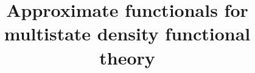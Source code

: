 \documentclass[journal=jacsat,manuscript=article]{achemso}
\author{}
\affiliation[]
{}
\title[]
  {Approximate functionals for multistate density functional theory}
\begin{document}
\begin{tocentry}





\end{tocentry}

\begin{abstract}

\end{abstract}

\end{document}
